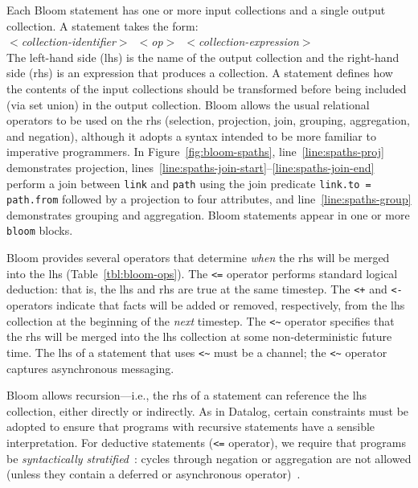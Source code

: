 Each Bloom statement has one or more input collections and a single output
collection.  A statement takes the form: \\ \noindent
\mbox{\hspace{0.25in}\emph{$<$collection-identifier$>$ $<$op$>$
    $<$collection-expression$>$}}\\ \noindent
The left-hand side (lhs) is the name of the output collection and the right-hand
side (rhs) is an expression that produces a collection.  A statement defines how
the contents of the input collections should be transformed before being
included (via set union) in the output collection. Bloom allows the usual
relational operators to be used on the rhs (selection, projection, join,
grouping, aggregation, and negation), although it adopts a syntax intended to be
more familiar to imperative programmers. In Figure~\ref{fig:bloom-spaths},
line~\ref{line:spaths-proj} demonstrates projection,
lines~\ref{line:spaths-join-start}--\ref{line:spaths-join-end} perform a join
between \texttt{link} and \texttt{path} using the join predicate
\verb+link.to = path.from+ followed by a projection to four attributes, and
line~\ref{line:spaths-group} demonstrates grouping and aggregation. Bloom
statements appear in one or more \texttt{bloom} blocks.%

Bloom provides several operators that determine \emph{when} the rhs will be
merged into the lhs (Table~\ref{tbl:bloom-ops}). The \verb|<=| operator performs
standard logical deduction: that is, the lhs and rhs are true at the same
timestep. The \verb|<+| and \verb|<-| operators indicate that facts will be
added or removed, respectively, from the lhs collection at the beginning of the
\emph{next} timestep. The \verb+<~+ operator specifies that the rhs will be merged into
the lhs collection at some non-deterministic future time. The lhs of a statement
that uses \verb+<~+ must be a channel; the \verb+<~+ operator captures
asynchronous messaging.

Bloom allows recursion---i.e., the rhs of a statement can reference the lhs
collection, either directly or indirectly. As in Datalog, certain constraints
must be adopted to ensure that programs with recursive statements have a
sensible interpretation. For deductive statements (\verb+<=+ operator), we
require that programs be \emph{syntactically stratified}~\cite{Apt1988}: cycles
through negation or aggregation are not allowed (unless they contain a deferred
or asynchronous operator)~\cite{dedalus}.

